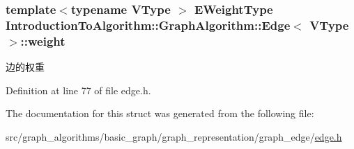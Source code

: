 \hypertarget{struct_introduction_to_algorithm_1_1_graph_algorithm_1_1_edge_a139b40cb4524df195804bdce7a117164}{}
\subsubsection[{weight}]{\setlength{\rightskip}{0pt plus 5cm}template$<$typename V\+Type $>$ {\bf E\+Weight\+Type} {\bf Introduction\+To\+Algorithm\+::\+Graph\+Algorithm\+::\+Edge}$<$ V\+Type $>$\+::weight}\label{struct_introduction_to_algorithm_1_1_graph_algorithm_1_1_edge_a139b40cb4524df195804bdce7a117164}
边的权重 

Definition at line 77 of file edge.\+h.



The documentation for this struct was generated from the following file\+:\begin{DoxyCompactItemize}
\item 
src/graph\+\_\+algorithms/basic\+\_\+graph/graph\+\_\+representation/graph\+\_\+edge/\hyperlink{edge_8h}{edge.\+h}\end{DoxyCompactItemize}
